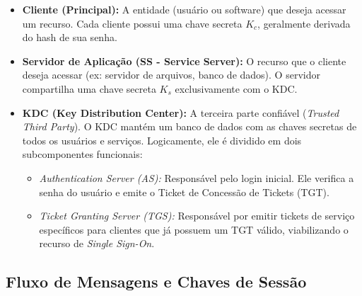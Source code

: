 \begin{itemize}
    \item \textbf{Cliente (Principal):} A entidade (usuário ou software) que deseja acessar um recurso. Cada cliente possui uma chave secreta $K_c$, geralmente derivada do hash de sua senha.
    \item \textbf{Servidor de Aplicação (SS - Service Server):} O recurso que o cliente deseja acessar (ex: servidor de arquivos, banco de dados). O servidor compartilha uma chave secreta $K_s$ exclusivamente com o KDC.
    \item \textbf{KDC (Key Distribution Center):} A terceira parte confiável (\textit{Trusted Third Party}). O KDC mantém um banco de dados com as chaves secretas de todos os usuários e serviços. Logicamente, ele é dividido em dois subcomponentes funcionais:
    \begin{itemize}
        \item \textit{Authentication Server (AS):} Responsável pelo login inicial. Ele verifica a senha do usuário e emite o Ticket de Concessão de Tickets (TGT).
        \item \textit{Ticket Granting Server (TGS):} Responsável por emitir tickets de serviço específicos para clientes que já possuem um TGT válido, viabilizando o recurso de \textit{Single Sign-On}.
    \end{itemize}
\end{itemize}

\subsection{Fluxo de Mensagens e Chaves de Sessão}

